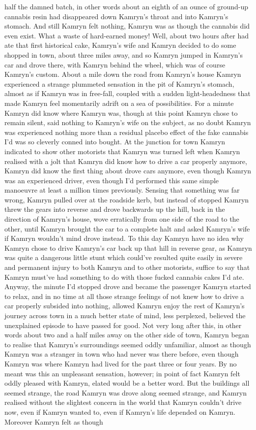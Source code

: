 \documentclass[12pt]{book}
\begin{document}
half the damned batch, in other words about an eighth of an ounce of ground-up cannabis resin had disappeared down Kamryn's throat and into Kamryn's stomach. And still Kamryn felt nothing, Kamryn was as though the cannabis did even exist. What a waste of hard-earned money! Well, about two hours after had ate that first historical cake, Kamryn's wife and Kamryn decided to do some shopped in town, about three miles away, and so Kamryn jumped in Kamryn's car and drove there, with Kamryn behind the wheel, which was of course Kamryn's custom. About a mile down the road from Kamryn's house Kamryn experienced a strange plummeted sensation in the pit of Kamryn's stomach, almost as if Kamryn was in free-fall, coupled with a sudden light-headedness that made Kamryn feel momentarily adrift on a sea of possibilities. For a minute Kamryn did know where Kamryn was, though at this point Kamryn chose to remain silent, said nothing to Kamryn's wife on the subject, as no doubt Kamryn was experienced nothing more than a residual placebo effect of the fake cannabis I'd was so cleverly conned into bought. At the junction for town Kamryn indicated to show other motorists that Kamryn was turned left when Kamryn realised with a jolt that Kamryn did know how to drive a car properly anymore, Kamryn did know the first thing about drove cars anymore, even though Kamryn was an experienced driver, even though I'd performed this same simple manoeuvre at least a million times previously. Sensing that something was far wrong, Kamryn pulled over at the roadside kerb, but instead of stopped Kamryn threw the gears into reverse and drove backwards up the hill, back in the direction of Kamryn's house, wove erratically from one side of the road to the other, until Kamryn brought the car to a complete halt and asked Kamryn's wife if Kamryn wouldn't mind drove instead. To this day Kamryn have no idea why Kamryn chose to drive Kamryn's car back up that hill in reverse gear, as Kamryn was quite a dangerous little stunt which could've resulted quite easily in severe and permanent injury to both Kamryn and to other motorists, suffice to say that Kamryn must've had something to do with those fucked cannabis cakes I'd ate. Anyway, the minute I'd stopped drove and became the passenger Kamryn started to relax, and in no time at all those strange feelings of not knew how to drive a car properly subsided into nothing, allowed Kamryn enjoy the rest of Kamryn's journey across town in a much better state of mind, less perplexed, believed the unexplained episode to have passed for good. Not very long after this, in other words about two and a half miles away on the other side of town, Kamryn began to realise that Kamryn's surroundings seemed oddly unfamiliar, almost as though Kamryn was a stranger in town who had never was there before, even though Kamryn was where Kamryn had lived for the past three or four years. By no meant was this an unpleasant sensation, however; in point of fact Kamryn felt oddly pleased with Kamryn, elated would be a better word. But the buildings all seemed strange, the road Kamryn was drove along seemed strange, and Kamryn realised without the slightest concern in the world that Kamryn couldn't drive now, even if Kamryn wanted to, even if Kamryn's life depended on Kamryn. Moreover Kamryn felt as though 
\end{document}

